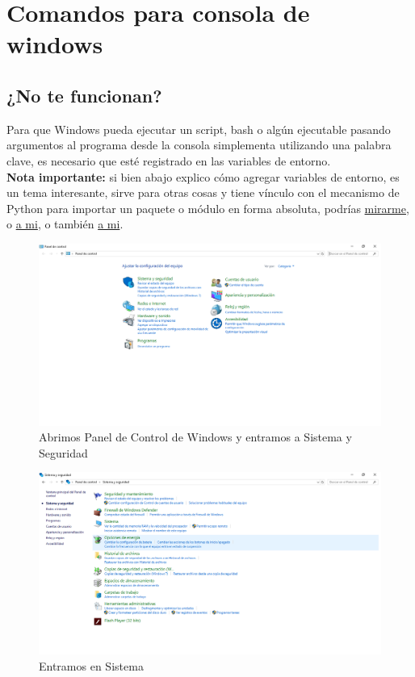 \section{Comandos para consola de windows}

\subsection{¿No te funcionan?}
Para que Windows pueda ejecutar un script, bash o alg\'un ejecutable pasando argumentos al programa desde la consola simplementa utilizando una palabra clave, es necesario
que est\'e registrado en las variables de entorno. 
\\
\textbf{Nota importante:} si bien abajo explico c\'omo agregar variables de entorno, es un tema interesante, sirve para otras cosas y tiene v\'inculo con el mecanismo de Python
para importar un paquete o m\'odulo en forma absoluta, podr\'ias \href{https://rootear.com/windows/variable-entorno-windows}{mirarme}, o \href{https://es.ccm.net/contents/652-variables-de-entorno}{a mi}, o tambi\'en \href{https://norfipc.com/inf/variables-entorno.html}{a mi}.


\begin{figure}[H]
    \centering
    \includegraphics[scale=0.3]{imagenes/cmd/cmd_0.PNG}
    \caption{Abrimos Panel de Control de Windows y entramos a Sistema y Seguridad}
\end{figure}

\begin{figure}[H]
    \centering
    \includegraphics[scale=0.3]{imagenes/cmd/cmd_1.PNG}
    \caption{Entramos en Sistema}
\end{figure}

